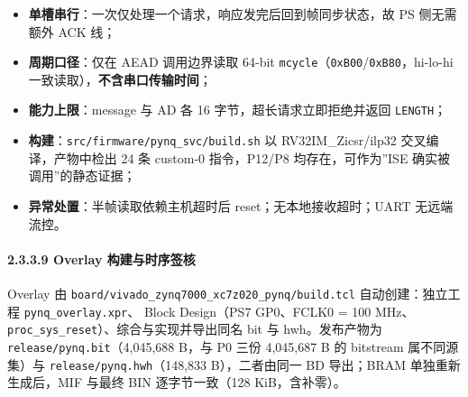 \begin{itemize}
\tightlist
\item
  \textbf{单槽串行}：一次仅处理一个请求，响应发完后回到帧同步状态，故 PS 侧无需额外 ACK 线；
\item
  \textbf{周期口径}：仅在 AEAD 调用边界读取 64-bit \texttt{mcycle}（\texttt{0xB00}/\texttt{0xB80}，hi-lo-hi 一致读取），\textbf{不含串口传输时间}；
\item
  \textbf{能力上限}：message 与 AD 各 16 字节，超长请求立即拒绝并返回 \texttt{LENGTH}；
\item
  \textbf{构建}：\texttt{src/\allowbreak{}firmware/\allowbreak{}pynq\_\allowbreak{}svc/\allowbreak{}build.\allowbreak{}sh} 以 RV32IM\_Zicsr/ilp32 交叉编译，产物中检出 24 条 custom-0 指令，P12/P8 均存在，可作为''ISE 确实被调用''的静态证据；
\item
  \textbf{异常处置}：半帧读取依赖主机超时后 reset；无本地接收超时；UART 无远端流控。
\end{itemize}


\Needspace{85pt}

\paragraph{2.3.3.9 Overlay 构建与时序签核}\label{overlay-ux6784ux5efaux4e0eux65f6ux5e8fux7b7eux6838}

Overlay 由 \texttt{board/\allowbreak{}vivado\_\allowbreak{}zynq7000\_\allowbreak{}xc7z020\_\allowbreak{}pynq/\allowbreak{}build.\allowbreak{}tcl} 自动创建：独立工程 \texttt{pynq\_\allowbreak{}overlay.\allowbreak{}xpr}、 Block Design（PS7 GP0、FCLK0 = 100 MHz、\texttt{proc\_\allowbreak{}sys\_\allowbreak{}reset}）、综合与实现并导出同名 bit 与 hwh。发布产物为 \texttt{release/\allowbreak{}pynq.\allowbreak{}bit}（4,045,688 B，与 P0 三份 4,045,687 B 的 bitstream 属不同源集）与 \texttt{release/\allowbreak{}pynq.\allowbreak{}hwh}（148,833 B），二者由同一 BD 导出；BRAM 单独重新生成后，MIF 与最终 BIN 逐字节一致（128 KiB，含补零）。


